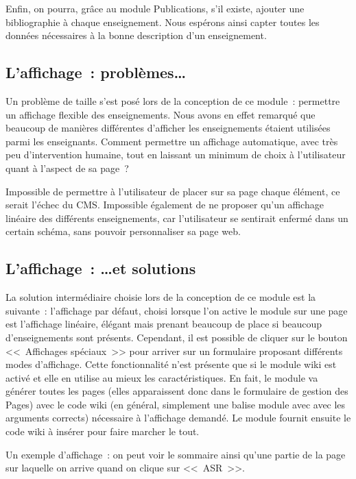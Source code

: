 \documentclass[final,11pt,a4paper,twoside,titlepage]{article}
\newcommand{\p}{\vspace{0.3em}}
\begin{document}
{    Enfin, on pourra, grâce au module Publications, s'il existe, ajouter une 
    bibliographie à chaque enseignement. Nous espérons ainsi capter toutes les
    données nécessaires à la bonne description d'un enseignement.

    \subsection{L'affichage~: problèmes\dots}
    Un problème de taille s'est posé lors de la conception de ce module~:
    permettre un affichage flexible des enseignements. Nous avons en effet remarqué
    que beaucoup de manières différentes d'afficher les enseignements étaient 
    utilisées parmi les enseignants. Comment permettre un affichage automatique,
    avec très peu d'intervention humaine, tout en laissant un minimum de choix à
    l'utilisateur quant à l'aspect de sa page~?\p

    Impossible de permettre à l'utilisateur de placer sur sa page chaque élément,
    ce serait l'échec du CMS. Impossible également de ne proposer qu'un affichage
    linéaire des différents enseignements, car l'utilisateur se sentirait enfermé
    dans un certain schéma, sans pouvoir personnaliser sa page web.\p

    \subsection{L'affichage~: \ldots et solutions}
    La solution intermédiaire choisie lors de la conception de ce module est la 
    suivante~: l'affichage par défaut, choisi lorsque l'on active le module sur
    une page est l'affichage linéaire, élégant mais prenant beaucoup de place si
    beaucoup d'enseignements sont présents. Cependant, il est possible de cliquer
    sur le bouton <<~Affichages spéciaux~>> pour arriver sur un formulaire proposant
    différents modes d'affichage. Cette fonctionnalité n'est présente que si le
    module wiki est activé et elle en utilise au mieux les caractéristiques.
    En fait, le module va générer toutes les pages (elles apparaissent donc dans
    le formulaire de gestion des Pages) avec le code wiki (en général, simplement 
    une balise module avec avec les arguments corrects) nécessaire à l'affichage
    demandé. Le module fournit ensuite le code wiki à insérer pour faire marcher
    le tout.\p

    Un exemple d'affichage~: on peut voir le sommaire ainsi qu'une
    partie de la page sur laquelle on arrive quand on clique sur <<~ASR~>>.

}
\end{document}
